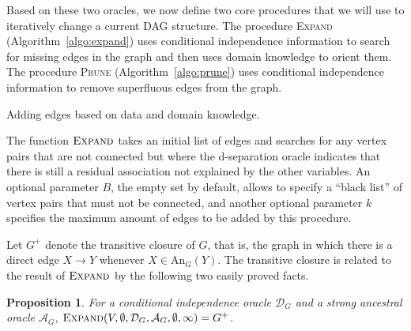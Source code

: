 \documentclass{uai2025} %
\newtheorem{proposition}{Proposition}
\begin{document}
Based on these two oracles, we now define two core procedures that we will use to 
iteratively change a current DAG structure. The procedure 
\textsc{Expand} (Algorithm~\ref{algo:expand}) uses conditional independence
information to search for missing edges in the graph and then uses domain
knowledge to orient them. The procedure \textsc{Prune} (Algorithm~\ref{algo:prune}) uses
conditional independence information to remove superfluous edges from the
graph.

\begin{algorithm}[h]
\DontPrintSemicolon
\SetAlgoLined
{}
\caption{Adding edges based on data and domain knowledge.}
\label{algo:expand}
\end{algorithm}

The function $\textsc{Expand}$ takes an initial list of edges and searches for 
any vertex pairs that are not connected but where the d-separation oracle 
indicates  that there is still a residual association not explained by the other variables.
An optional parameter $B$, the empty set by default, allows to specify a ``black list''
of vertex pairs that must not be connected, and another optional parameter $k$
specifies the maximum amount of edges to be added by this procedure.

Let $G^+$ denote the transitive closure of $G$, that is, the graph in which 
there is a direct edge $X \to Y$ whenever $X \in \textrm{An}_G(Y)$. The transitive
closure is related to the result of $\textsc{Expand}$ by the following two 
easily proved facts.

\begin{proposition}
For a conditional independence oracle
 $\mathcal{D}_G$ and a strong ancestral oracle $\mathcal{A}_G$, 
$\textsc{Expand}(V,\emptyset,\mathcal{D}_G,\mathcal{A}_G, \emptyset, \infty)=G^+$.
\label{prop:strongexpand}
\end{proposition}
\end{document}
